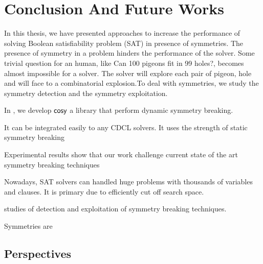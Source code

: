 \chapter{Conclusion And Future Works}\label{chap:conclu}






In this thesis, we have presented approaches to increase the performance of solving 
Boolean satisfiability problem (SAT) in presence of symmetries. 
The presence of symmetry in a problem hinders the performance of the solver.
Some trivial question for an human, like Can 100 pigeons fit in 99 holes?,
becomes almost impossible for a solver. The solver will explore each pair of pigeon, hole and 
will face to a combinatorial explosion.To deal with symmetries, we study the symmetry detection 
and the symmetry exploitation.

In , we develop $\textsf{cosy}$ a library that perform dynamic symmetry breaking.

It can be integrated easily to any CDCL solvers. It uses the strength of static symmetry breaking 

Experimental results show that our work challenge current state of the art symmetry breaking techniques


Nowadays, SAT solvers can handled huge problems with thousands of variables and clauses. 
It is primary due to efficiently cut off search space.

studies of detection and exploitation of symmetry breaking techniques.

Symmetries are 



\section{Perspectives}



